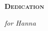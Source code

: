 \newpage 
{}
{}
\begin{flushleft}
	\Huge \textsc{\textbf{Dedication}}

\end{flushleft}
\vspace*{8cm}
\begin{flushright}
   \emph{for Hanna}
\end{flushright}
 
